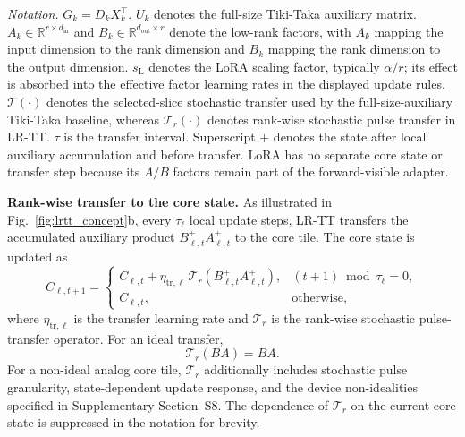 \documentclass[fleqn,10pt]{wlscirep}
\begin{document}
\begin{table}[!t]
{  \vspace{0.25em}
  \begin{minipage}{0.98\textwidth}
  \noindent
  \emph{Notation.}
  \(G_k=D_kX_k^{\top}\).
  \(U_k\) denotes the full-size Tiki-Taka auxiliary matrix.
  \(A_k\in\mathbb{R}^{r\times d_{\mathrm{in}}}\) and
  \(B_k\in\mathbb{R}^{d_{\mathrm{out}}\times r}\) denote the low-rank factors, with \(A_k\) mapping the input dimension to the rank dimension and \(B_k\) mapping the rank dimension to the output dimension.
  \(s_{\mathrm{L}}\) denotes the LoRA scaling factor, typically \(\alpha/r\); its effect is absorbed into the effective factor learning rates in the displayed update rules.
  \(\mathcal{T}(\cdot)\) denotes the selected-slice stochastic transfer used by the full-size-auxiliary Tiki-Taka baseline, whereas \(\mathcal{T}_r(\cdot)\) denotes rank-wise stochastic pulse transfer in LR-TT.
  \(\tau\) is the transfer interval.
  Superscript \(+\) denotes the state after local auxiliary accumulation and before transfer.
  LoRA has no separate core state or transfer step because its \(A/B\) factors remain part of the forward-visible adapter.
  \end{minipage}
  }
\end{table}

\noindent\textbf{Rank-wise transfer to the core state.}
As illustrated in Fig.~\ref{fig:lrtt_concept}b, every \(\tau_\ell\) local update steps, LR-TT transfers the accumulated auxiliary product
\(B_{\ell,t}^{+}A_{\ell,t}^{+}\)
to the core tile.
The core state is updated as
\begin{equation}
C_{\ell,t+1}
=
\begin{cases}
C_{\ell,t}
+
\eta_{\mathrm{tr},\ell}\,
\mathcal{T}_{r}\!\left(
B_{\ell,t}^{+}A_{\ell,t}^{+}
\right),
&
(t+1)\bmod\tau_\ell=0,
\\[4pt]
C_{\ell,t},
&
\mathrm{otherwise},
\end{cases}
\label{eq:lrtt_transformer_transfer}
\end{equation}
where \(\eta_{\mathrm{tr},\ell}\) is the transfer learning rate and
\(\mathcal{T}_{r}\) is the rank-wise stochastic pulse-transfer operator.
For an ideal transfer,
\[
\mathcal{T}_{r}(BA)=BA.
\]
For a non-ideal analog core tile,
\(\mathcal{T}_{r}\) additionally includes stochastic pulse granularity, state-dependent update response, and the device non-idealities specified in Supplementary Section~S8.
The dependence of \(\mathcal{T}_{r}\) on the current core state is suppressed in the notation for brevity.
\end{document}
